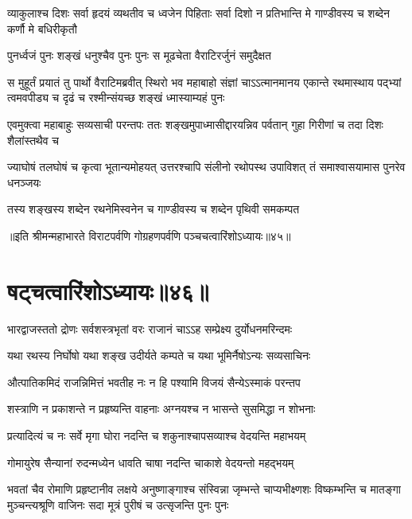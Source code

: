 \threelineshloka
{व्याकुलाश्च दिशः सर्वा हृदयं व्यथतीव च}
{ध्वजेन पिहिताः सर्वा दिशो न प्रतिभान्ति मे}
{गाण्डीवस्य च शब्देन कर्णौ मे बधिरीकृतौ}



\twolineshloka
{पुनर्ध्वजं पुनः शङ्खं धनुश्चैव पुनः पुनः}
{स मूढचेता वैराटिरर्जुनं समुदैक्षत}


\onelineshloka
{स मुहूर्तं प्रयातं तु पार्थो वैराटिमब्रवीत्}
\threelineshloka
{स्थिरो भव महाबाहो संज्ञां चाऽऽत्मानमानय}
{एकान्ते रथमास्थाय पद्भ्यां त्वमवपीड्य च}
{दृढं च रश्मीन्संयच्छ शङ्खं ध्मास्याम्यहं पुनः}


\threelineshloka
{एवमुक्त्वा महाबाहुः सव्यसाची परन्तपः}
{ततः शङ्खमुपाध्मासीद्दारयन्निव पर्वतान्}
{गुहा गिरीणां च तदा दिशः शैलांस्तथैव च}


\threelineshloka
{ज्याघोषं तलघोषं च कृत्वा भूतान्यमोहयत्}
{उत्तरश्चापि संलीनो रथोपस्थ उपाविशत्}
{तं समाश्वासयामास पुनरेव धनञ्जयः}


\twolineshloka
{तस्य शङ्खस्य शब्देन रथनेमिस्वनेन च}
{गाण्डीवस्य च शब्देन पृथिवी समकम्पत}

॥इति श्रीमन्महाभारते विराटपर्वणि गोग्रहणपर्वणि पञ्चचत्वारिंशोऽध्यायः॥४५॥

\chapter{षट्चत्वारिंशोऽध्यायः॥४६॥}

\twolineshloka
{भारद्वाजस्ततो द्रोणः सर्वशस्त्रभृतां वरः}
{राजानं चाऽऽह सम्प्रेक्ष्य दुर्योधनमरिन्दमः}


\twolineshloka
{यथा रथस्य निर्घोषो यथा शङ्ख उदीर्यते}
{कम्पते च यथा भूमिर्नैषोऽन्यः सव्यसाचिनः}


\twolineshloka
{औत्पातिकमिदं राजन्निमित्तं भवतीह नः}
{न हि पश्यामि विजयं सैन्येऽस्माकं परन्तप}


\twolineshloka
{शस्त्राणि न प्रकाशन्ते न प्रहृष्यन्ति वाहनाः}
{अग्नयश्च न भासन्ते सुसमिद्धा न शोभनाः}


\twolineshloka
{प्रत्यादित्यं च नः सर्वे मृगा घोरा नदन्ति च}
{शकुनाश्चापसव्याश्च वेदयन्ति महाभयम्}


\twolineshloka
{गोमायुरेष सैन्यानां रुदन्मध्येन धावति}
{चाषा नदन्ति चाकाशे वेदयन्तो महद्भयम्}


\onelineshloka
{भवतां चैव रोमाणि प्रहृष्टानीव लक्षये}
\threelineshloka
{अनुष्णाङ्गाश्च संस्विन्ना जृम्भन्ते चाप्यभीक्ष्णशः}
{विष्कम्भन्ति च मातङ्गा मुञ्चन्त्यश्रूणि वाजिनः}
{सदा मूत्रं पुरीषं च उत्सृजन्ति पुनः पुनः}


